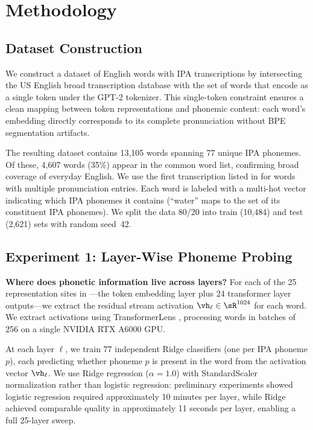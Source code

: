 \section{Methodology}
\label{sec:method}

\subsection{Dataset Construction}
\label{sec:data}

We construct a dataset of English words with IPA transcriptions by intersecting the \wikipron US English broad transcription database \citep{lee2020massively} with the set of words that encode as a single token under the GPT-2 tokenizer.
This single-token constraint ensures a clean mapping between token representations and phonemic content: each word's embedding directly corresponds to its complete pronunciation without BPE segmentation artifacts.

The resulting dataset contains 13{,}105 words spanning 77 unique IPA phonemes.
Of these, 4{,}607 words (35\%) appear in the \oxfordfive common word list, confirming broad coverage of everyday English.
We use the first transcription listed in \wikipron for words with multiple pronunciation entries.
Each word is labeled with a multi-hot vector indicating which IPA phonemes it contains (\eg ``water'' maps to the set of its constituent IPA phonemes).
We split the data 80/20 into train (10{,}484) and test (2{,}621) sets with random seed~42.

\subsection{Experiment 1: Layer-Wise Phoneme Probing}
\label{sec:method_probing}

{\bf Where does phonetic information live across layers?}
For each of the 25 representation sites in \gptmed---the token embedding layer plus 24 transformer layer outputs---we extract the residual stream activation $\vh_\ell \in \sR^{1024}$ for each word.
We extract activations using TransformerLens \citep{nanda2022transformerlens}, processing words in batches of 256 on a single NVIDIA RTX A6000 GPU.

At each layer $\ell$, we train 77 independent Ridge classifiers (one per IPA phoneme $p$), each predicting whether phoneme $p$ is present in the word from the activation vector $\vh_\ell$.
We use Ridge regression ($\alpha = 1.0$) with StandardScaler normalization rather than logistic regression: preliminary experiments showed logistic regression required approximately 10 minutes per layer, while Ridge achieved comparable quality in approximately 11 seconds per layer, enabling a full 25-layer sweep.


